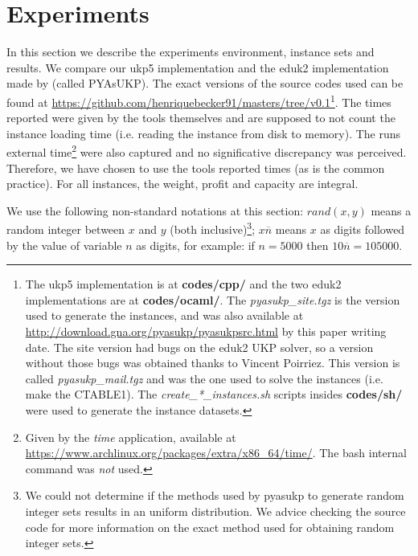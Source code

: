 \documentclass[runningheads,a4paper]{llncs}
\begin{document}
\section{Experiments}
In this section we describe the experiments environment, instance sets and results. We compare our ukp5 implementation and the eduk2 implementation made by \cite{CPYA} (called PYAsUKP). The exact versions of the source codes used can be found at \url{https://github.com/henriquebecker91/masters/tree/v0.1}\footnote{The ukp5 implementation is at \textbf{codes/cpp/} and the two eduk2 implementations are at \textbf{codes/ocaml/}. The \emph{pyasukp\_site.tgz} is the version used to generate the instances, and was also available at \url{http://download.gna.org/pyasukp/pyasukpsrc.html} by this paper writing date. The site version had bugs on the eduk2 UKP solver, so a version without those bugs was obtained thanks to Vincent Poirriez. This version is called \emph{pyasukp\_mail.tgz} and was the one used to solve the instances (i.e. make the CTABLE1). The \emph{create\_*\_instances.sh} scripts insides \textbf{codes/sh/} were used to generate the instance datasets.}. The times reported were given by the tools themselves and are supposed to not count the instance loading time (i.e. reading the instance from disk to memory). The runs external time\footnote{Given by the \textit{time} application, available at \url{https://www.archlinux.org/packages/extra/x86_64/time/}. The bash internal command was \emph{not} used.} were also captured and no significative discrepancy was perceived. Therefore, we have chosen to use the tools reported times (as is the common practice). For all instances, the weight, profit and capacity are integral.

We use the following non-standard notations at this section: \(rand(x, y)\) means a random integer between \(x\) and \(y\) (both inclusive)\footnote{We could not determine if the methods used by pyasukp to generate random integer sets results in an uniform distribution. We advice checking the source code for more information on the exact method used for obtaining random integer sets.}; \(x\overline{n}\) means \(x\) as digits followed by the value of variable \(n\) as digits, for example: if \(n = 5000\) then \(10\overline{n} = 105000\).
\end{document}
